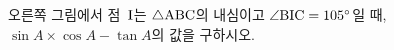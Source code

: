 \noindent\begin{minipage}[t]{0.58\linewidth}\vspace{0pt}\raggedright 오른쪽 그림에서 점~$\mathrm{I}$는 $\triangle\mathrm{ABC}$의 내심이고 $\angle\mathrm{BIC}=105^\circ$일 때, $\sin A\times\cos A-\tan A$의 값을 구하시오.\end{minipage}\hfill\begin{minipage}[t]{0.4\linewidth}\vspace{0pt}\centering \resizebox{\ifdim\width>\linewidth\linewidth\else\width\fi}{!}{}\end{minipage}\par
